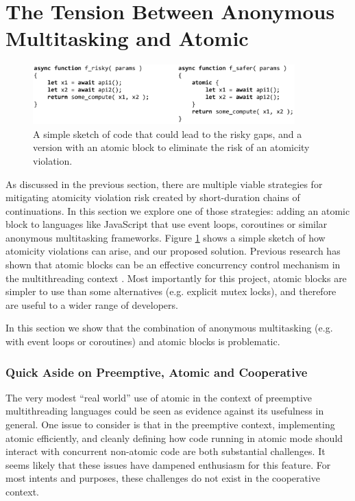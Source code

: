 \documentclass[acmsmall,anonymous,review]{acmart}\settopmatter{printfolios=true,printccs=false,printacmref=false}
\begin{document}
\section{The Tension Between Anonymous Multitasking and Atomic}

\begin{figure}
\includegraphics[width=0.9\textwidth]{Code/async_atomic_js}
\caption{A simple sketch of code that could lead to the risky gaps, and a version with an atomic block to eliminate the risk of an atomicity violation.}
\label{fig:async_atomic_js}
\end{figure}

As discussed in the previous section, there are multiple viable strategies for mitigating atomicity violation risk created by short-duration chains of continuations.
In this section we explore one of those strategies: adding an atomic block to languages like JavaScript that use event loops, coroutines or similar anonymous multitasking frameworks.
Figure \ref{fig:async_atomic_js} shows a simple sketch of how atomicity violations can arise, and our proposed solution.
Previous research has shown that atomic blocks can be an effective concurrency control mechanism in the multithreading context \cite{Pankratius2011, Pankratius2014}.
Most importantly for this project, atomic blocks are simpler to use than some alternatives (e.g. explicit mutex locks), and therefore are useful to a wider range of developers.

In this section we show that the combination of anonymous multitasking (e.g. with event loops or coroutines) and atomic blocks is problematic.

\subsubsection{Quick Aside on Preemptive, Atomic and Cooperative}

The very modest ``real world'' use of atomic in the context of preemptive multithreading languages could be seen as evidence against its usefulness in general.
One issue to consider is that in the preemptive context, implementing atomic efficiently, and cleanly defining how code running in atomic mode should interact with concurrent non-atomic code are both substantial challenges.
It seems likely that these issues have dampened enthusiasm for this feature.
For most intents and purposes, these challenges do not exist in the cooperative context.
\end{document}
